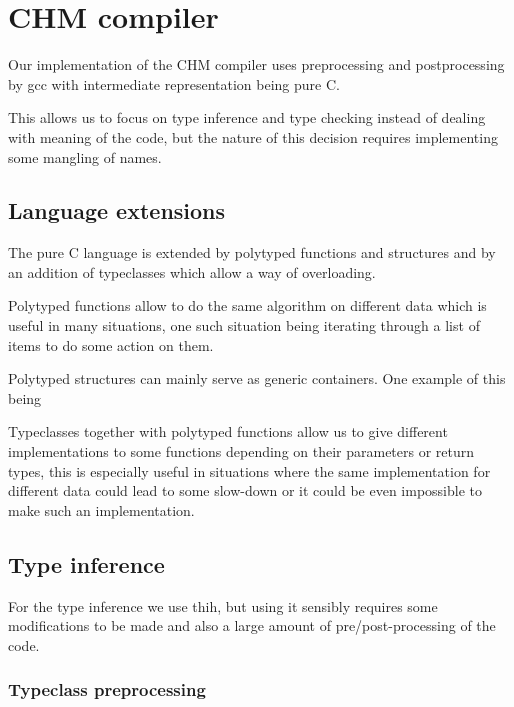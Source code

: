 \chapter{CHM compiler}

Our implementation of the CHM compiler uses preprocessing and postprocessing by gcc
with intermediate representation being pure C.

This allows us to focus on type inference and type checking instead of dealing with
meaning of the code, but the nature of this decision requires implementing some mangling
of names.


\section{Language extensions}

The pure C language is extended by polytyped functions and structures and by
an addition of typeclasses which allow a way of overloading.

Polytyped functions allow to do the same algorithm on different data
which is useful in many situations, one such situation being iterating
through a list of items to do some action on them.

Polytyped structures can mainly serve as generic containers.
One example of this being %

Typeclasses together with polytyped functions allow us to give different
implementations to some functions depending on their parameters or return
types, this is especially useful in situations where the same implementation
for different data could lead to some slow-down or it could be even
impossible to make such an implementation.



\section{Type inference}

For the type inference we use thih, %
but using it sensibly requires some modifications to be made and also a large
amount of pre/post-processing of the code.

\subsection{Typeclass preprocessing}

